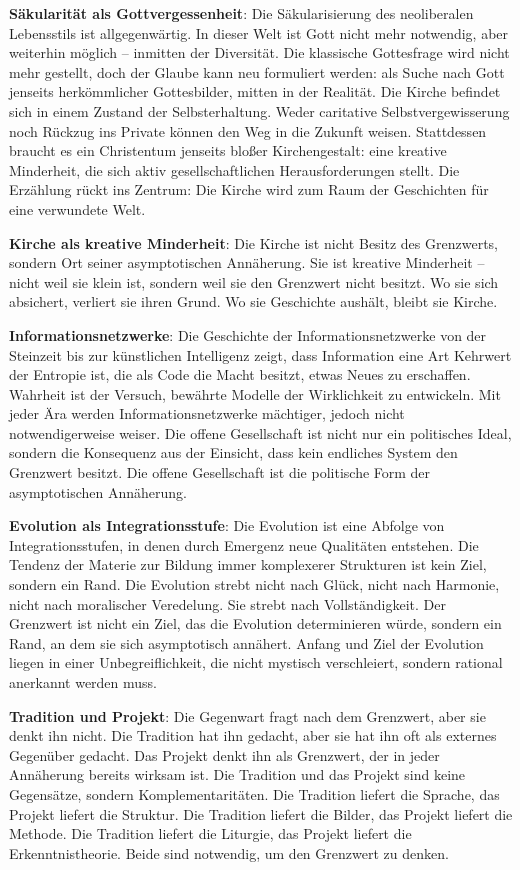 \documentclass[
  ngerman,
]{article}
\begin{document}
\textbf{Säkularität als Gottvergessenheit}: Die Säkularisierung des
neoliberalen Lebensstils ist allgegenwärtig. In dieser Welt ist Gott
nicht mehr notwendig, aber weiterhin möglich -- inmitten der Diversität.
Die klassische Gottesfrage wird nicht mehr gestellt, doch der Glaube
kann neu formuliert werden: als Suche nach Gott jenseits herkömmlicher
Gottesbilder, mitten in der Realität. Die Kirche befindet sich in einem
Zustand der Selbsterhaltung. Weder caritative Selbstvergewisserung noch
Rückzug ins Private können den Weg in die Zukunft weisen. Stattdessen
braucht es ein Christentum jenseits bloßer Kirchengestalt: eine kreative
Minderheit, die sich aktiv gesellschaftlichen Herausforderungen stellt.
Die Erzählung rückt ins Zentrum: Die Kirche wird zum Raum der
Geschichten für eine verwundete Welt.

\textbf{Kirche als kreative Minderheit}: Die Kirche ist nicht Besitz des
Grenzwerts, sondern Ort seiner asymptotischen Annäherung. Sie ist
kreative Minderheit -- nicht weil sie klein ist, sondern weil sie den
Grenzwert nicht besitzt. Wo sie sich absichert, verliert sie ihren
Grund. Wo sie Geschichte aushält, bleibt sie Kirche.

\textbf{Informationsnetzwerke}: Die Geschichte der Informationsnetzwerke
von der Steinzeit bis zur künstlichen Intelligenz zeigt, dass
Information eine Art Kehrwert der Entropie ist, die als Code die Macht
besitzt, etwas Neues zu erschaffen. Wahrheit ist der Versuch, bewährte
Modelle der Wirklichkeit zu entwickeln. Mit jeder Ära werden
Informationsnetzwerke mächtiger, jedoch nicht notwendigerweise weiser.
Die offene Gesellschaft ist nicht nur ein politisches Ideal, sondern die
Konsequenz aus der Einsicht, dass kein endliches System den Grenzwert
besitzt. Die offene Gesellschaft ist die politische Form der
asymptotischen Annäherung.

\textbf{Evolution als Integrationsstufe}: Die Evolution ist eine Abfolge
von Integrationsstufen, in denen durch Emergenz neue Qualitäten
entstehen. Die Tendenz der Materie zur Bildung immer komplexerer
Strukturen ist kein Ziel, sondern ein Rand. Die Evolution strebt nicht
nach Glück, nicht nach Harmonie, nicht nach moralischer Veredelung. Sie
strebt nach Vollständigkeit. Der Grenzwert ist nicht ein Ziel, das die
Evolution determinieren würde, sondern ein Rand, an dem sie sich
asymptotisch annähert. Anfang und Ziel der Evolution liegen in einer
Unbegreiflichkeit, die nicht mystisch verschleiert, sondern rational
anerkannt werden muss.

\textbf{Tradition und Projekt}: Die Gegenwart fragt nach dem Grenzwert,
aber sie denkt ihn nicht. Die Tradition hat ihn gedacht, aber sie hat
ihn oft als externes Gegenüber gedacht. Das Projekt denkt ihn als
Grenzwert, der in jeder Annäherung bereits wirksam ist. Die Tradition
und das Projekt sind keine Gegensätze, sondern Komplementaritäten. Die
Tradition liefert die Sprache, das Projekt liefert die Struktur. Die
Tradition liefert die Bilder, das Projekt liefert die Methode. Die
Tradition liefert die Liturgie, das Projekt liefert die
Erkenntnistheorie. Beide sind notwendig, um den Grenzwert zu denken.
\end{document}
